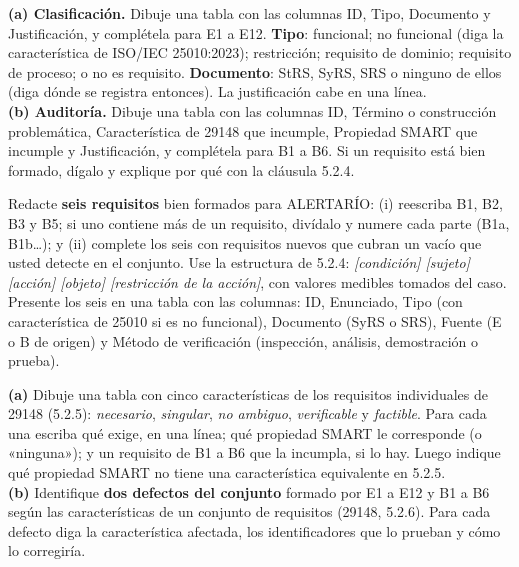 \documentclass[11pt]{article}
\begin{document}
\begin{cajatarea}[title={T2. Clasificación y auditoría \hfill D2 · 30\,\%}]
	\textbf{(a) Clasificación.} Dibuje una tabla con las columnas ID, Tipo, Documento y Justificación, y complétela para E1 a E12. \textbf{Tipo}: funcional; no funcional (diga la característica de ISO/IEC 25010:2023); restricción; requisito de dominio; requisito de proceso; o no es requisito. \textbf{Documento}: StRS, SyRS, SRS o ninguno de ellos (diga dónde se registra entonces). La justificación cabe en una línea.\\[4pt]
	\textbf{(b) Auditoría.} Dibuje una tabla con las columnas ID, Término o construcción problemática, Característica de 29148 que incumple, Propiedad SMART que incumple y Justificación, y complétela para B1 a B6. Si un requisito está bien formado, dígalo y explique por qué con la cláusula 5.2.4.
\end{cajatarea}

\begin{cajatarea}[title={T3. Redacción de requisitos bien formados \hfill D3 · 30\,\%}]
	Redacte \textbf{seis requisitos} bien formados para ALERTARÍO: (i) reescriba B1, B2, B3 y B5; si uno contiene más de un requisito, divídalo y numere cada parte (B1a, B1b\ldots); y (ii) complete los seis con requisitos nuevos que cubran un vacío que usted detecte en el conjunto. Use la estructura de 5.2.4: \emph{[condición] [sujeto] [acción] [objeto] [restricción de la acción]}, con valores medibles tomados del caso.\\[4pt]
	Presente los seis en una tabla con las columnas: ID, Enunciado, Tipo (con característica de 25010 si es no funcional), Documento (SyRS o SRS), Fuente (E o B de origen) y Método de verificación (inspección, análisis, demostración o prueba).
\end{cajatarea}

\begin{cajatarea}[title={T4. Sustento normativo de la calidad \hfill D4 · 20\,\% (junto con las citas de T1 a T3)}]
	\textbf{(a)} Dibuje una tabla con cinco características de los requisitos individuales de 29148 (5.2.5): \emph{necesario}, \emph{singular}, \emph{no ambiguo}, \emph{verificable} y \emph{factible}. Para cada una escriba qué exige, en una línea; qué propiedad SMART le corresponde (o «ninguna»); y un requisito de B1 a B6 que la incumpla, si lo hay. Luego indique qué propiedad SMART no tiene una característica equivalente en 5.2.5.\\[4pt]
	\textbf{(b)} Identifique \textbf{dos defectos del conjunto} formado por E1 a E12 y B1 a B6 según las características de un conjunto de requisitos (29148, 5.2.6). Para cada defecto diga la característica afectada, los identificadores que lo prueban y cómo lo corregiría.
\end{cajatarea}
\end{document}
